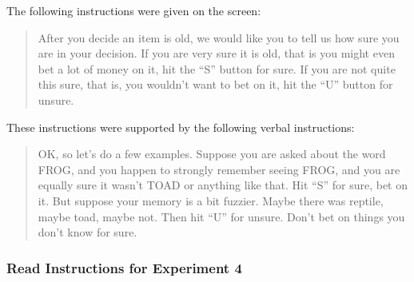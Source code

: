 \documentclass[english,,man,floatsintext]{apa6}
\begin{document}
The following instructions were given on the screen:

\begin{quote}After you decide an item is old, we would like you to tell us how sure you are in your
decision. If you are very sure it is old, that is you might even bet a lot of money on
it, hit the ``S” button for sure. If you are not quite this sure, that is, you wouldn't
want to bet on it, hit the ``U” button for unsure.
\end{quote}

These instructions were supported by the following verbal instructions:

\begin{quote}OK, so let's do a few examples. Suppose you are asked about the word FROG, and
you happen to strongly remember seeing FROG, and you are equally sure it wasn't
TOAD or anything like that. Hit ``S” for sure, bet on it. But suppose your memory is a bit
fuzzier. Maybe there was reptile, maybe toad, maybe not. Then hit ``U” for unsure.
Don't bet on things you don't know for sure.
\end{quote}

\hypertarget{read-instructions-for-experiment-4}{%
\subsubsection{Read Instructions for Experiment 4}\label{read-instructions-for-experiment-4}}
\end{document}
